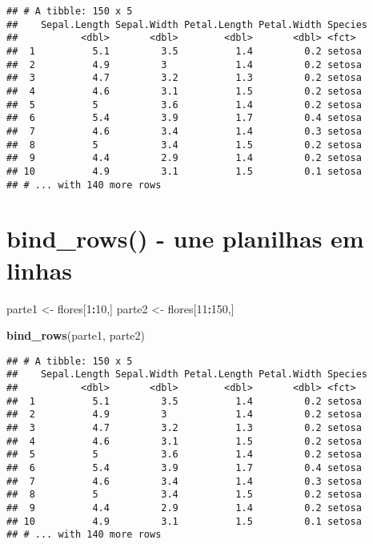 \documentclass[]{book}
\newenvironment{Shaded}{\begin{snugshade}}{\end{snugshade}}
\newcommand{\DecValTok}[1]{\textcolor[rgb]{0.00,0.00,0.81}{#1}}
\newcommand{\KeywordTok}[1]{\textcolor[rgb]{0.13,0.29,0.53}{\textbf{#1}}}
\newcommand{\NormalTok}[1]{#1}
\newcommand{\OperatorTok}[1]{\textcolor[rgb]{0.81,0.36,0.00}{\textbf{#1}}}
\newcommand{\StringTok}[1]{\textcolor[rgb]{0.31,0.60,0.02}{#1}}
\begin{document}
\begin{verbatim}
## # A tibble: 150 x 5
##    Sepal.Length Sepal.Width Petal.Length Petal.Width Species
##           <dbl>       <dbl>        <dbl>       <dbl> <fct>  
##  1          5.1         3.5          1.4         0.2 setosa 
##  2          4.9         3            1.4         0.2 setosa 
##  3          4.7         3.2          1.3         0.2 setosa 
##  4          4.6         3.1          1.5         0.2 setosa 
##  5          5           3.6          1.4         0.2 setosa 
##  6          5.4         3.9          1.7         0.4 setosa 
##  7          4.6         3.4          1.4         0.3 setosa 
##  8          5           3.4          1.5         0.2 setosa 
##  9          4.4         2.9          1.4         0.2 setosa 
## 10          4.9         3.1          1.5         0.1 setosa 
## # ... with 140 more rows
\end{verbatim}

\hypertarget{bind_rows---une-planilhas-em-linhas}{%
\section{bind\_rows() - une planilhas em linhas}\label{bind_rows---une-planilhas-em-linhas}}

\begin{Shaded}
\begin{Highlighting}[]
\NormalTok{parte1 <-}\StringTok{ }\NormalTok{flores[}\DecValTok{1}\OperatorTok{:}\DecValTok{10}\NormalTok{,]}
\NormalTok{parte2 <-}\StringTok{ }\NormalTok{flores[}\DecValTok{11}\OperatorTok{:}\DecValTok{150}\NormalTok{,]}

\KeywordTok{bind_rows}\NormalTok{(parte1, parte2)}
\end{Highlighting}
\end{Shaded}

\begin{verbatim}
## # A tibble: 150 x 5
##    Sepal.Length Sepal.Width Petal.Length Petal.Width Species
##           <dbl>       <dbl>        <dbl>       <dbl> <fct>  
##  1          5.1         3.5          1.4         0.2 setosa 
##  2          4.9         3            1.4         0.2 setosa 
##  3          4.7         3.2          1.3         0.2 setosa 
##  4          4.6         3.1          1.5         0.2 setosa 
##  5          5           3.6          1.4         0.2 setosa 
##  6          5.4         3.9          1.7         0.4 setosa 
##  7          4.6         3.4          1.4         0.3 setosa 
##  8          5           3.4          1.5         0.2 setosa 
##  9          4.4         2.9          1.4         0.2 setosa 
## 10          4.9         3.1          1.5         0.1 setosa 
## # ... with 140 more rows
\end{verbatim}
\end{document}
